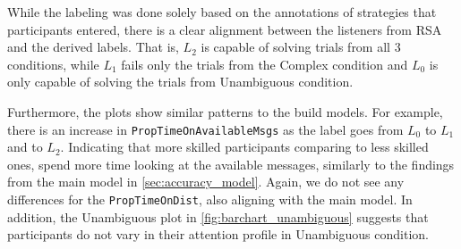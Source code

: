 While the labeling was done solely based on the annotations of strategies that participants entered, there is a clear alignment between the listeners from RSA and the derived labels. That is, $L_2$ is capable of solving trials from all 3 conditions, while $L_1$ fails only the trials from the Complex condition and $L_0$ is only capable of solving the trials from Unambiguous condition. 

Furthermore, the plots show similar patterns to the build models. For example, there is an increase in \texttt{PropTimeOnAvailableMsgs} as the label goes from $L_0$ to $L_1$ and to $L_2$. Indicating that more skilled participants comparing to less skilled ones, spend more time looking at the available messages, similarly to the findings from the main model in \autoref{sec:accuracy_model}. Again, we do not see any differences for the \texttt{PropTimeOnDist}, also aligning with the main model. In addition, the Unambiguous plot in \autoref{fig:barchart_unambiguous} suggests that participants do not vary in their attention profile in Unambiguous condition.

